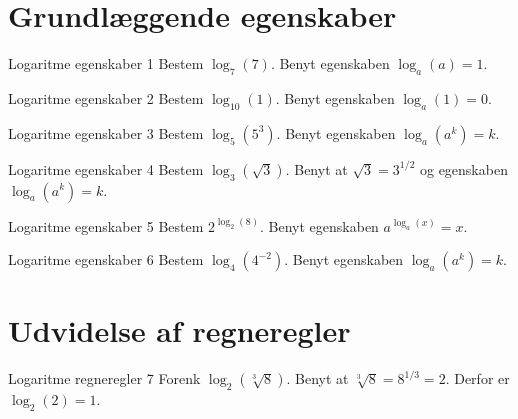 \documentclass{article}
\begin{document}
\tableofcontents
\newpage

\section*{Grundl\ae{}ggende egenskaber}

\begin{exercise}{Logaritme egenskaber 1}
Bestem $\log_{7}(7)$.
\hint
Benyt egenskaben $\log_a(a) = 1$.
\end{exercise}

\newpage

\begin{exercise}{Logaritme egenskaber 2}
Bestem $\log_{10}(1)$.
\hint
Benyt egenskaben $\log_a(1) = 0$.
\end{exercise}

\newpage

\begin{exercise}{Logaritme egenskaber 3}
Bestem $\log_{5}(5^3)$.
\hint
Benyt egenskaben $\log_a(a^k) = k$.
\end{exercise}

\newpage

\begin{exercise}{Logaritme egenskaber 4}
Bestem $\log_{3}(\sqrt{3})$.
\hint
Benyt at $\sqrt{3} = 3^{1/2}$ og egenskaben $\log_a(a^k) = k$.
\end{exercise}

\newpage

\begin{exercise}{Logaritme egenskaber 5}
Bestem $2^{\log_2(8)}$.
\hint
Benyt egenskaben $a^{\log_a(x)} = x$.
\end{exercise}

\newpage

\begin{exercise}{Logaritme egenskaber 6}
Bestem $\log_{4}(4^{-2})$.
\hint
Benyt egenskaben $\log_a(a^k) = k$.
\end{exercise}

\newpage

\section*{Udvidelse af regneregler}

\begin{exercise}{Logaritme regneregler 7}
Forenk $\log_2(\sqrt[3]{8})$.
\hint
Benyt at $\sqrt[3]{8} = 8^{1/3} = 2$.
\hint
Derfor er $\log_2(2) = 1$.
\end{exercise}
\end{document}
